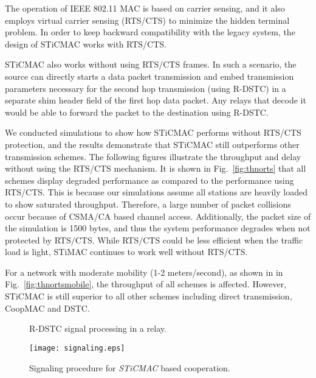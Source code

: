 \documentclass[peerreview,draftcls,onecolumn,12pt,a4paper]{IEEEtran}
\begin{document}
\newpage
\begin{appendix}
The operation of IEEE 802.11 MAC is based on carrier sensing, and it also employs virtual carrier sensing (RTS/CTS) to minimize the hidden terminal problem. In order to keep backward compatibility with the legacy system, the design of STiCMAC works with RTS/CTS. 

STiCMAC also works without using RTS/CTS frames. In such a scenario, the source can directly starts a data packet transmission and embed transmission parameters necessary for the second hop transmission (using R-DSTC) in a separate shim header field of the first hop data packet. Any relays that decode it would be able to forward the packet to the destination using R-DSTC.

We conducted simulations to show how STiCMAC performs without RTS/CTS protection, and the results demonstrate that STiCMAC still outperforms other transmission schemes. The following figures illustrate the throughput and delay without using the RTS/CTS mechanism. It is shown in Fig.~\ref{fig:thnorts} that all schemes display degraded performance as compared to the performance using RTS/CTS. This is because our simulations assume all stations are heavily loaded to show saturated throughput. Therefore, a large number of packet collisions occur because of CSMA/CA based channel access. Additionally, the packet size of the simulation is 1500 bytes, and thus the system performance degrades when not protected by RTS/CTS. While RTS/CTS could be less efficient when the traffic load is light,  STiMAC continues to work well without RTS/CTS. 

For a network with moderate mobility (1-2 meters/second), as shown in in Fig.~\ref{fig:thnortsmobile}, the throughput of all schemes is affected. However, STiCMAC is still superior to all other schemes including direct transmission, CoopMAC and DSTC. 
\end{appendix}




\pagebreak



\begin{figure}
    \caption{R-DSTC signal processing in a relay.}
    \label{fig:rdstc_block} \vspace{4in}
\end{figure}

\begin{figure}
\centering
   \texttt{[image: signaling.eps]}
\caption{\label{fig:RDSTCsignaling} Signaling procedure for
\emph{STiCMAC} based cooperation.}
\end{figure}
\end{document}
